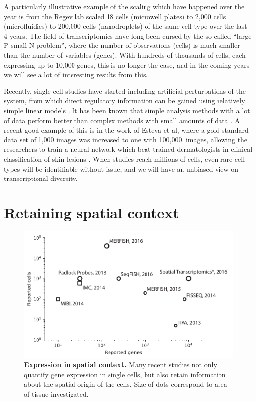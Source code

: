 A particularly illustrative example of the scaling which have happened over the year is from the Regev lab scaled 18 cells \cite{Shalek2014-gu} (microwell plates) to 2,000 cells \cite{Shalek2014-gu} (microfluidics) to 200,000 cells \cite{Dixit2016-qx} (nanodroplets) of the same cell type over the last 4 years. The field of transcriptomics have long been cursed by the so called ``large P small N problem'', where the number of observations (cells) is much smaller than the number of variables (genes). With hundreds of thousands of cells, each expressing up to 10,000 genes, this is no longer the case, and in the coming years we will see a lot of interesting results from this.

Recently, single cell studies have started including artificial perturbations of the system, from which direct regulatory information can be gained using relatively simple linear models \cite{Dixit2016-qx, Jaitin2016-sj, Adamson2016-mt, Datlinger2017-aa}. It has been known that simple analysis methods with a lot of data perform better than complex methods with small amounts of data \cite{Halevy2009-uj}. A recent good example of this is in the work of Esteva et al, where a gold standard data set of 1,000 images was increased to one with 100,000, images, allowing the researchers to train a neural network which beat trained dermatologists in clinical classification of skin lesions \cite{Esteva2017-cw}. When studies reach millions of cells, even rare cell types will be identifiable without issue, and we will have an unbiased view on transcriptional diversity.

\section{Retaining spatial context}

\begin{figure}
    \centering
    \centerline{\includegraphics[width=.75\textwidth]{"SpatialTechnologies"}}
    \caption[Expression in spatial context]{\textbf{Expression in spatial context.} Many recent studies not only quantify gene expression in single cells, but also retain information about the spatial origin of the cells. Size of dots correspond to area of tissue investigated.}
    \label{fig:spatial}
\end{figure}

